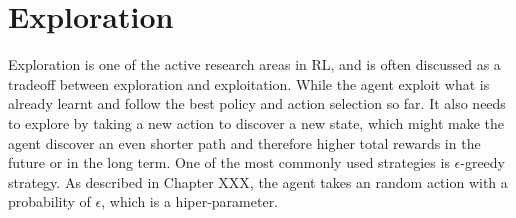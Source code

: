







\section{Exploration}
\label{exploration}
Exploration is one of the active research areas in RL, and is often discussed as a tradeoff between exploration and exploitation. 
While the agent exploit what is already learnt and follow the best policy and action selection so far.
It also needs to explore by taking a new action to discover a new state, which might make the agent discover an even shorter path and therefore higher total rewards in the future or in the long term. 
One of the most commonly used strategies is $\epsilon$-greedy strategy. 
As described in Chapter XXX, the agent takes an random action with a probability of $\epsilon$, which is a hiper-parameter.

